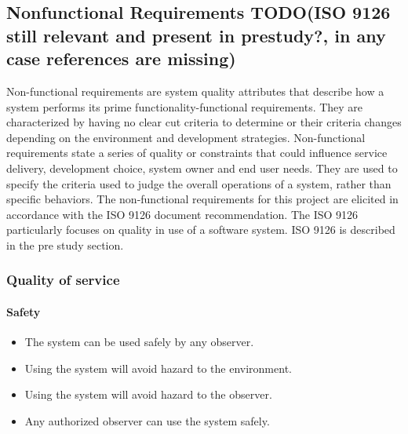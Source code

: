 \newpage
\subsection{Nonfunctional Requirements TODO(ISO 9126 still relevant and present in prestudy?, in any case references are missing)}
Non-functional requirements are system quality attributes that describe how a system performs its prime functionality-functional requirements.
They are characterized by having no clear cut criteria to determine or their criteria
changes depending on the environment and development strategies.
Non-functional requirements state a series of quality or constraints that could influence service delivery,
development choice, system owner and end user needs.
They are used to specify the criteria used to judge the overall operations of a system,
rather than specific behaviors.
The non-functional requirements for this project are elicited in accordance with the ISO 9126 document recommendation.
The ISO 9126 particularly focuses on quality in use of a software system.
ISO 9126 is described in the pre study section.
\\[0.4cm]

\subsubsection{Quality of service}
	\paragraph{Safety}

	\begin{itemize}
		\item The system can be used safely by any observer.
        \item Using the system will avoid hazard to the environment.
        \item Using the system will avoid hazard to the observer.
        \item Any authorized observer can use the system safely.
	\end{itemize}
